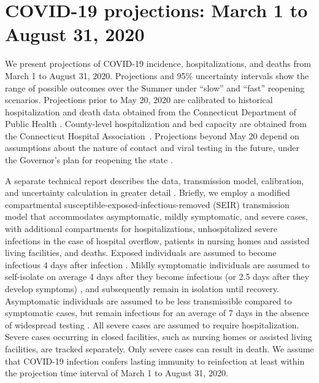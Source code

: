 \documentclass[11pt]{article}
\begin{document}

\section*{COVID-19 projections: March 1 to August 31, 2020}

We present projections of COVID-19 incidence, hospitalizations, and deaths from March 1 to August 31, 2020.  Projections and 95\% uncertainty intervals show the range of possible outcomes over the Summer under ``slow'' and ``fast'' reopening scenarios.  Projections prior to May 20, 2020 are calibrated to historical hospitalization and death data obtained from the Connecticut Department of Public Health \citep{DPHwebsite}.  County-level hospitalization and bed capacity are obtained from the Connecticut Hospital Association~\citep{CHAwebsite}.  Projections beyond May 20 depend on assumptions about the nature of contact and viral testing in the future, under the Governor's plan for reopening the state \citep{ct2020coronavirus}.  

A separate technical report describes the data, transmission model, calibration, and uncertainty calculation in greater detail \citep{morozova2020tech}.  Briefly, we employ a modified compartmental susceptible-exposed-infectious-removed (SEIR) transmission model that accommodates asymptomatic, mildly symptomatic, and severe cases, with additional compartments for hospitalizations, unhospitalized severe infections in the case of hospital overflow, patients in nursing homes and assisted living facilities, and deaths. Exposed individuals are assumed to become infectious 4 days after infection \citep{lauer2020incubation, bi2020epidemiology, li2020early, linton2020incubation, he2020estimation, salje2020estimating, wei2020presymptomatic}.  Mildly symptomatic individuals are assumed to self-isolate on average 4 days after they become infectious (or 2.5 days after they develop symptoms) \citep{salje2020estimating, li2020substantial, kissler2020projecting}, and subsequently remain in isolation until recovery. Asymptomatic individuals are assumed to be less transmissible compared to symptomatic cases, but remain infectious for an average of 7 days in the absence of widespread testing \citep{wolfel2020virological}. All severe cases are assumed to require hospitalization. Severe cases occurring in closed facilities, such as nursing homes or assisted living facilities, are tracked separately. Only severe cases can result in death. We assume that COVID-19 infection confers lasting immunity to reinfection at least within the projection time interval of March 1 to August 31, 2020.  
\end{document}
